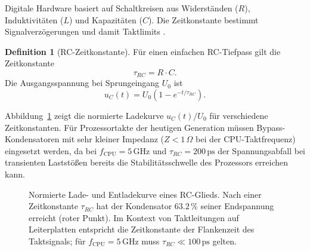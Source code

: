 ﻿\documentclass[a4paper,12pt]{scrreprt}
\theoremstyle{definition}
\newtheorem{definition}{Definition}[chapter]
\begin{document}
	Digitale Hardware basiert auf Schaltkreisen aus Widerständen ($R$),
	Induktivitäten ($L$) und Kapazitäten ($C$). Die Zeitkonstante bestimmt
	Signalverzögerungen und damit Taktlimits \cite{Epp2026physd}.

	\begin{definition}[RC-Zeitkonstante]
		Für einen einfachen RC-Tiefpass gilt die Zeitkonstante
		\[
		\tau_{RC} = R \cdot C.
		\]
		Die Ausgangsspannung bei Sprungeingang $U_0$ ist
		\[
		u_C(t) = U_0 \left(1 - e^{-t/\tau_{RC}}\right).
		\]
	\end{definition}

	Abbildung~\ref{fig:rc-charge} zeigt die normierte Ladekurve
	$u_C(t)/U_0$ für verschiedene Zeitkonstanten. Für Prozessortakte
	der heutigen Generation müssen Bypass-Kondensatoren mit sehr kleiner
	Impedanz ($Z < 1\,\Omega$ bei der CPU-Taktfrequenz) eingesetzt werden,
	da bei $f_{\text{CPU}} = 5\,\text{GHz}$ und $\tau_{RC} = 200\,\text{ps}$
	der Spannungsabfall bei transienten Laststößen bereits die
	Stabilitätsschwelle des Prozessors erreichen kann.

	\begin{figure}[H]
		\centering
		\caption{Normierte Lade- und Entladekurve eines RC-Glieds. Nach einer
			Zeitkonstante $\tau_{RC}$ hat der Kondensator $63.2\,\%$ seiner
			Endspannung erreicht (roter Punkt). Im Kontext von Taktleitungen auf
			Leiterplatten entspricht die Zeitkonstante der Flankenzeit des
			Taktsignals; für $f_{\text{CPU}} = 5\,\text{GHz}$ muss
			$\tau_{RC} \ll 100\,\text{ps}$ gelten.}
		\label{fig:rc-charge}
	\end{figure}
\end{document}

